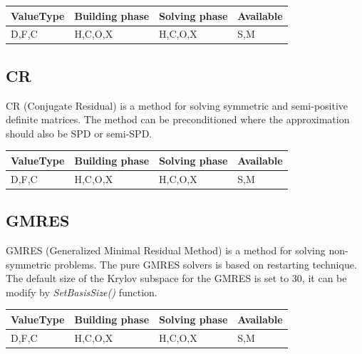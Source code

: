 \begin{table}[H]
\begin{tabular}{l|l|l|l}
\multicolumn{1}{c|}{ValueType} & Building phase & Solving phase & Available \\ \hline
D,F,C                          & H,C,O,X        & H,C,O,X       & S,M      
\end{tabular}
\end{table}




\subsection{CR}

CR (Conjugate Residual) is a method for solving symmetric and semi-positive definite matrices. The method can be preconditioned where the approximation should also be SPD or semi-SPD.


\begin{table}[H]
\begin{tabular}{l|l|l|l}
\multicolumn{1}{c|}{ValueType} & Building phase & Solving phase & Available \\ \hline
D,F,C                          & H,C,O,X        & H,C,O,X       & S,M      
\end{tabular}
\end{table}




\subsection{GMRES}

GMRES (Generalized Minimal Residual Method) is a method for solving non-symmetric problems. The pure GMRES solvers is based on restarting technique. The default size of the Krylov subspace for the GMRES is set to 30, it can be modify by \emph{SetBasisSize()} function.

\begin{table}[H]
\begin{tabular}{l|l|l|l}
\multicolumn{1}{c|}{ValueType} & Building phase & Solving phase & Available \\ \hline
D,F,C                          & H,C,O,X        & H,C,O,X       & S,M      
\end{tabular}
\end{table}





